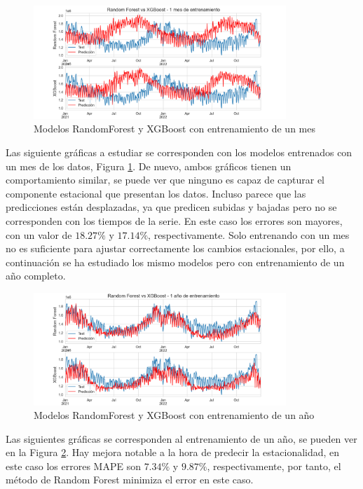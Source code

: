 \documentclass[12pt,twoside]{article}
\begin{document}
\begin{figure}[h]
\centering
    \includegraphics[width = 0.85\textwidth]{imagenes/autoreg_direct1.png}
    \caption{Modelos RandomForest y XGBoost con entrenamiento de un mes}\label{fig:autoreg_direct1}
\end{figure}

Las siguiente gráficas a estudiar se corresponden con los modelos entrenados con un mes de los datos, Figura \ref{fig:autoreg_direct1}. De nuevo, ambos gráficos tienen un comportamiento similar, se puede ver que ninguno es capaz de capturar el componente estacional que presentan los datos. Incluso parece que las predicciones están desplazadas, ya que predicen subidas y bajadas pero no se corresponden con los tiempos de la serie. En este caso los errores son mayores, con un valor de $18.27\%$ y $17.14\%$, respectivamente. Solo entrenando con un mes no es suficiente para ajustar correctamente los cambios estacionales, por ello, a continuación se ha estudiado los mismo modelos pero con entrenamiento de un año completo.


\begin{figure}[h]
\centering
    \includegraphics[width = 0.85\textwidth]{imagenes/autoreg_direct2.png}
    \caption{Modelos RandomForest y XGBoost con entrenamiento de un año}\label{fig:autoreg_direct2}
\end{figure}

Las siguientes gráficas se corresponden al entrenamiento de un año, se pueden ver en la Figura \ref{fig:autoreg_direct2}. Hay mejora notable a la hora de predecir la estacionalidad, en este caso los errores MAPE son $7.34\%$ y $9.87\%$, respectivamente, por tanto, el método de Random Forest minimiza el error en este caso.
\end{document}
